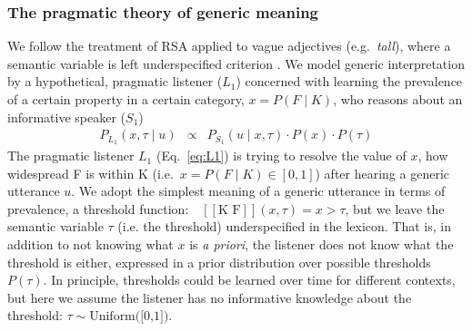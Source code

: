 \documentclass[12pt,letterpaper]{article}
\newcommand{\denote}[1]{\mbox{ $[\![ #1 ]\!]$}}
\begin{document}


\subsubsection*{The pragmatic theory of generic meaning}

We follow the treatment of RSA applied to vague adjectives (e.g.~\emph{tall}), where a semantic variable is left underspecified criterion \cite{Lassiter2013,Lassiter2015}.
We model generic interpretation by a hypothetical, pragmatic listener ($L_1$) concerned with learning the prevalence of a certain property in a certain category, $x=P(F \mid K)$, who reasons about an informative speaker ($S_1$)
%
\begin{eqnarray}
P_{L_{1}}(x , \tau \mid u) &\propto& P_{S_{1}}(u \mid x, \tau) \cdot P(x) \cdot P(\tau) \label{eq:L1}
\end{eqnarray}
%
The pragmatic listener $L_1$ (Eq.~\ref{eq:L1}) is trying to resolve the value of $x$, how widespread F is within K (i.e.~$x = P(F\mid K) \in [0, 1]$) after hearing a generic utterance $u$. 
We adopt the simplest meaning of a generic utterance in terms of prevalence, a threshold function: $\denote{\text{K F}}(x, \tau)=x>\tau$, but we leave the semantic variable $\tau$ (i.e. the threshold) underspecified in the lexicon. 
That is, in addition to not knowing what $x$ is \emph{a priori}, the listener does not know what the threshold is either, expressed in a prior distribution over possible thresholds $P(\tau)$.
In principle, thresholds could be learned over time for different contexts, but here we assume the listener has no informative knowledge about the threshold: $\tau \sim \text{Uniform([0,1])}$.
\end{document}
